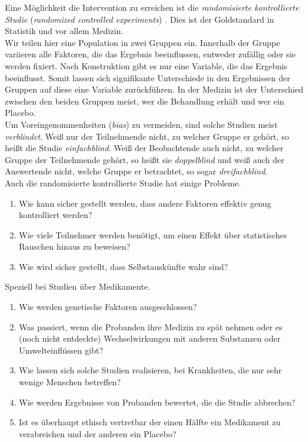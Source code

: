 \documentclass[headsepline,11pt,bibliography=leveldown]{scrbook}
\newcommand{\en}[1]{{\scriptsize(\textit{#1})}}
\begin{document}
Eine Möglichkeit die Intervention zu erreichen ist die \textit{randomisierte kontrollierte Studie} \en{randomized controlled experiments} \cite[S. 53]{Primer}. Dies ist der Goldstandard in Statistik und vor allem Medizin.\\
Wir teilen hier eine Population in zwei Gruppen ein. Innerhalb der Gruppe variieren alle Faktoren, die das Ergebnis beeinflussen, entweder zufällig oder sie werden fixiert. Nach Konstruktion gibt es nur eine Variable, die das Ergebnis beeinflusst. Somit lassen sich signifikante Unterschiede in den Ergebnissen der Gruppen auf diese eine Variable zurückführen. In der Medizin ist der Unterschied zwischen den beiden Gruppen meist, wer die Behandlung erhält und wer ein Placebo.\\
Um Voreingenommenheiten \en{bias} zu vermeiden, sind solche Studien meist \textit{verblindet}. Weiß nur der Teilnehmende nicht, zu welcher Gruppe er gehört, so heißt die Studie \textit{einfachblind}. Weiß der Beobachtende auch nicht, zu welcher Gruppe der Teilnehmende gehört, so heißt sie \textit{doppelblind} und weiß auch der Auswertende nicht, welche Gruppe er betrachtet, so sogar \textit{dreifachblind}.\\

Auch die randomisierte kontrollierte Studie hat einige Probleme.
\begin{enumerate}[label=(\roman*)]
\item Wie kann sicher gestellt werden, dass andere Faktoren effektiv genug kontrolliert werden?
\item Wie viele Teilnehmer werden benötigt, um einen Effekt über statistisches Rauschen hinaus zu \glqq beweisen\grqq{}?
\item Wie wird sicher gestellt, dass Selbstauskünfte wahr sind?
\end{enumerate}
Speziell bei Studien über Medikamente.
\begin{enumerate}[label=(\roman*), resume]
\item Wie werden genetische Faktoren ausgeschlossen?
\item Was passiert, wenn die Probanden ihre Medizin zu spät nehmen oder es (noch nicht entdeckte) Wechselwirkungen mit anderen Substanzen oder Umwelteinflüssen gibt?
\item Wie lassen sich solche Studien realisieren, bei Krankheiten, die nur sehr wenige Menschen betreffen?
\item Wie werden Ergebnisse von Probanden bewertet, die die Studie abbrechen?
\item Ist es überhaupt ethisch vertretbar der einen Hälfte ein Medikament zu verabreichen und der anderen ein Placebo?
\end{enumerate}
\end{document}
